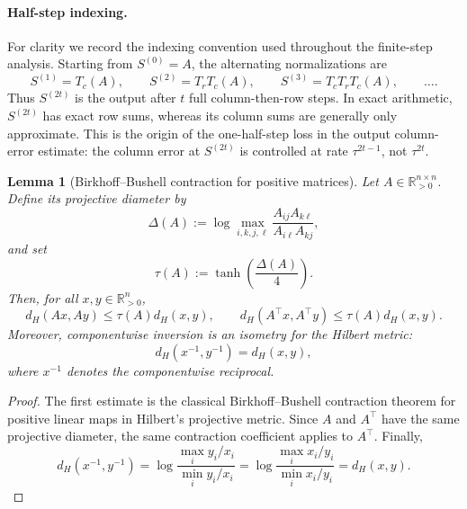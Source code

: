 \documentclass[11pt]{article}
\numberwithin{equation}{section}
\theoremstyle{plain}
\newtheorem{lemma}[theorem]{Lemma}
\theoremstyle{definition}
\theoremstyle{remark}
\newcommand{\R}{\mathbb{R}}
\begin{document}
\paragraph{Half-step indexing.}
For clarity we record the indexing convention used throughout the finite-step
analysis.  Starting from \(S^{(0)}=A\), the alternating normalizations are
\begin{equation}
    S^{(1)}=T_c(A),\qquad
    S^{(2)}=T_rT_c(A),\qquad
    S^{(3)}=T_cT_rT_c(A),\qquad \ldots .
\end{equation}
Thus \(S^{(2t)}\) is the output after \(t\) full column-then-row steps.  In exact
arithmetic, \(S^{(2t)}\) has exact row sums, whereas its column sums are generally
only approximate.  This is the origin of the one-half-step loss in the output
column-error estimate: the column error at \(S^{(2t)}\) is controlled at rate
\(\tau^{2t-1}\), not \(\tau^{2t}\).

\begin{lemma}[Birkhoff--Bushell contraction for positive matrices]
\label{lem:birkhoff-bushell}
Let \(A\in\R_{>0}^{n\times n}\).  Define its projective diameter by
\begin{equation}
    \Delta(A)
    :=
    \log \max_{i,k,j,\ell}
    \frac{A_{ij}A_{k\ell}}{A_{i\ell}A_{kj}},
\end{equation}
and set
\begin{equation}
    \tau(A):=\tanh\!\left(\frac{\Delta(A)}4\right).
\end{equation}
Then, for all \(x,y\in\R^n_{>0}\),
\begin{equation}
    d_H(Ax,Ay)\le \tau(A)d_H(x,y),
    \qquad
    d_H(A^\top x,A^\top y)\le \tau(A)d_H(x,y).
\end{equation}
Moreover, componentwise inversion is an isometry for the Hilbert metric:
\begin{equation}
    d_H(x^{-1},y^{-1})=d_H(x,y),
\end{equation}
where \(x^{-1}\) denotes the componentwise reciprocal.
\end{lemma}

\begin{proof}
The first estimate is the classical Birkhoff--Bushell contraction theorem for
positive linear maps in Hilbert's projective metric.  Since \(A\) and \(A^\top\)
have the same projective diameter, the same contraction coefficient applies to
\(A^\top\).  Finally,
\[
    d_H(x^{-1},y^{-1})
    =
    \log\frac{\max_i y_i/x_i}{\min_i y_i/x_i}
    =
    \log\frac{\max_i x_i/y_i}{\min_i x_i/y_i}
    =
    d_H(x,y).
\]
\end{proof}
\end{document}
